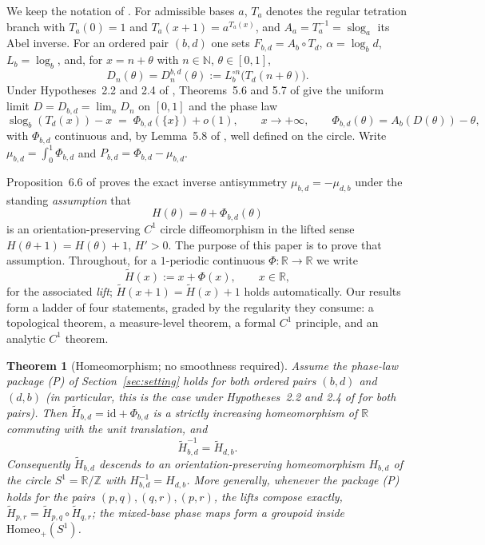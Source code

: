 \documentclass[11pt]{article}
\newtheorem{theoremA}{Theorem}
\theoremstyle{definition}
\theoremstyle{remark}
\newcommand{\R}{\mathbb{R}}
\newcommand{\N}{\mathbb{N}}
\newcommand{\Z}{\mathbb{Z}}
\newcommand{\Sone}{S^{1}}
\newcommand{\Lb}{L_{b}}
\newcommand{\Ab}{A_{b}}
\newcommand{\Td}{T_{d}}
\newcommand{\frc}[1]{\{#1\}}
\newcommand{\Ht}{\widetilde H}
\DeclareMathOperator{\slog}{slog}
\begin{document}
We keep the notation of \cite{J}. For admissible bases $a$, $T_a$ denotes
the regular tetration branch with $T_a(0)=1$ and $T_a(x+1)=a^{T_a(x)}$, and
$A_a=T_a^{-1}=\slog_a$ its Abel inverse. For an ordered pair $(b,d)$ one
sets $F_{b,d}=\Ab\circ\Td$, $\alpha=\log_b d$, $\Lb=\log_b$, and, for
$x=n+\theta$ with $n\in\N$, $\theta\in[0,1]$,
\[
D_n(\theta)=D_n^{b,d}(\theta):=\Lb^{\circ n}\big(\Td(n+\theta)\big).
\]
Under Hypotheses~2.2 and 2.4 of \cite{J}, Theorems~5.6 and 5.7 of \cite{J}
give the uniform limit $D=D_{b,d}=\lim_n D_n$ on $[0,1]$ and the phase law
\begin{equation}\label{eq:phaselaw}
\slog_b(\Td(x))-x \;=\; \Phi_{b,d}(\frc{x})+o(1),
\qquad x\to+\infty,
\qquad
\Phi_{b,d}(\theta)=\Ab(D(\theta))-\theta ,
\end{equation}
with $\Phi_{b,d}$ continuous and, by Lemma~5.8 of \cite{J}, well defined on
the circle. Write $\mu_{b,d}=\int_0^1\Phi_{b,d}$ and
$P_{b,d}=\Phi_{b,d}-\mu_{b,d}$.

Proposition~6.6 of \cite{J} proves the exact inverse antisymmetry
$\mu_{b,d}=-\mu_{d,b}$ under the standing \emph{assumption} that
\[
H(\theta)=\theta+\Phi_{b,d}(\theta)
\]
is an orientation-preserving $C^{1}$ circle diffeomorphism in the lifted
sense $H(\theta+1)=H(\theta)+1$, $H'>0$. The purpose of this paper is to
prove that assumption. Throughout, for a $1$-periodic continuous
$\Phi:\R\to\R$ we write
\[
\Ht(x):=x+\Phi(x),\qquad x\in\R,
\]
for the associated \emph{lift}; $\Ht(x+1)=\Ht(x)+1$ holds automatically.
Our results form a ladder of four statements, graded by the regularity
they consume: a topological theorem, a measure-level theorem, a formal
$C^{1}$ principle, and an analytic $C^{1}$ theorem.

\begin{theoremA}[Homeomorphism; no smoothness required]\label{thm:A}
Assume the phase-law package \textup{(P)} of Section~\ref{sec:setting}
holds for both ordered pairs $(b,d)$ and $(d,b)$ (in particular, this is
the case under Hypotheses~2.2 and 2.4 of \cite{J} for both pairs). Then
$\Ht_{b,d}=\mathrm{id}+\Phi_{b,d}$ is a strictly increasing homeomorphism
of $\R$ commuting with the unit translation, and
\[
\Ht_{b,d}^{-1}=\Ht_{d,b}.
\]
Consequently $\Ht_{b,d}$ descends to an orientation-preserving
homeomorphism $H_{b,d}$ of the circle $\Sone=\R/\Z$ with
$H_{b,d}^{-1}=H_{d,b}$. More generally, whenever the package \textup{(P)}
holds for the pairs $(p,q),(q,r),(p,r)$, the lifts compose exactly,
$\Ht_{p,r}=\Ht_{p,q}\circ\Ht_{q,r}$; the mixed-base phase maps form a
groupoid inside $\mathrm{Homeo}_{+}(\Sone)$.
\end{theoremA}
\end{document}
